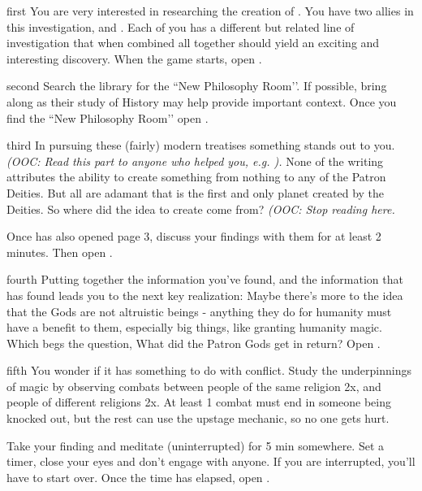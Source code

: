 \documentclass[notebook]{GL2020} %
\begin{document}
\startnotebook{\nCreationTwo{}}

\begin{page}{first}
You are very interested in researching the creation of \pEarth{}. You have two allies in this investigation, \cEbbPriest{} and \cScholarship{}. Each of you has a different but related line of investigation that when combined all together should yield an exciting and interesting discovery. When the game starts, open .
\end{page}

\begin{page}{second}
Search the library for the ``New Philosophy Room’’. If possible, bring \cHistory along as their study of History may help provide important context. Once you find the ``New Philosophy Room’’ open .
\end{page}

\begin{page}{third}
In pursuing these (fairly) modern treatises something stands out to you. \emph{(OOC: Read this part to anyone who helped you, e.g. \cHistory{}).} None of the writing attributes the ability to create something from nothing to any of the Patron Deities. But all are adamant that \pEarth{} is the first and only planet created by the Deities. So where did the idea to create\pEarth{} come from? \emph{(OOC: Stop reading here.}

Once \textbf{\cEbbPriest{}} has also opened page 3, discuss your findings with them for at least 2 minutes. Then open .
\end{page}

\begin{page}{fourth}
Putting together the information you’ve found, and the information that \cEbbPriest{} has found leads you to the next key realization: Maybe there’s more to the idea that  the Gods are not altruistic beings - anything they do for humanity must have a benefit to them, especially big things, like granting humanity magic. Which begs the question, What did the Patron Gods get in return? Open .
\end{page}

\begin{page}{fifth}
You wonder if it has something to do with conflict. Study the underpinnings of magic by observing combats between people of the same religion 2x, and people of different religions 2x. At least 1 combat must end in someone being knocked out, but the rest can use the upstage mechanic, so no one gets hurt.

Take your finding and meditate (uninterrupted) for 5 min somewhere. Set a timer, close your eyes and don’t engage with anyone. If you are interrupted, you’ll have to start over. Once the time has elapsed, open .
\end{page}
\end{document}
